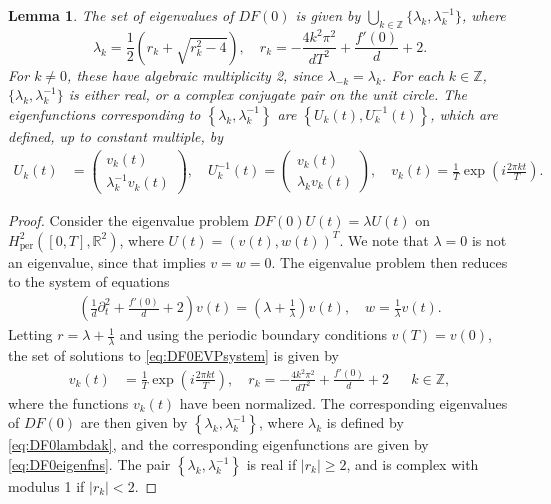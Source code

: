 \documentclass[12pt,reqno]{amsart}
\def\R{{\mathbb R}}
\def\Z{{\mathbb Z}}
\def\per{\textrm{per}}
\newtheorem{lemma}{Lemma}
\theoremstyle{definition}
\begin{document}
\begin{lemma}\label{lemma:DF0eigs}
The set of eigenvalues of $DF(0)$ is given by $\bigcup_{k \in \Z} \{\lambda_k, \lambda_k^{-1} \}$, where 
\begin{equation}\label{eq:DF0lambdak}
\lambda_k = \frac{1}{2}\left( r_k + \sqrt{r_k^2 - 4} \right), \quad r_k = -\frac{4 k^2 \pi^2}{d T^2} + \frac{f'(0)}{d} + 2.
\end{equation}
For $k \neq 0$, these have algebraic multiplicity 2, since $\lambda_{-k} = \lambda_k$. For each $k \in \Z$, $\{\lambda_k, \lambda_k^{-1} \}$ is either real, or a complex conjugate pair on the unit circle. The eigenfunctions corresponding to $\left\{ \lambda_k, \lambda_k^{-1} \right\}$ are $\left\{ U_k(t), U_k^{-1}(t) \right\}$, which are defined, up to constant multiple, by 
\begin{equation}\label{eq:DF0eigenfns}
\begin{aligned}
U_k(t) &= \begin{pmatrix}v_k(t) \\ \lambda_k^{-1}  v_k(t) \end{pmatrix}, \quad
U_k^{-1}(t) = \begin{pmatrix}v_k(t) \\ \lambda_k v_k(t) \end{pmatrix}, \quad
v_k(t) = \frac{1}{T} \exp\left( i \frac{2 \pi k t}{T} \right).
\end{aligned}
\end{equation}
\end{lemma}
\begin{proof}
Consider the eigenvalue problem $DF(0) U(t) = \lambda U(t)$ on $H^2_\per([0,T],\R^2)$, where $U(t) = (v(t), w(t))^T$. We note that $\lambda = 0$ is not an eigenvalue, since that implies $v = w = 0$. The eigenvalue problem then reduces to the system of equations
\begin{align}\label{eq:DF0EVPsystem}
\left( \frac{1}{d}\partial_t^2 + \frac{f'(0)}{d} + 2 \right) v(t) = \left( \lambda + \frac{1}{\lambda} \right) v(t), \quad
w = \frac{1}{\lambda} v(t).
\end{align}
Letting $r = \lambda + \frac{1}{\lambda}$ and using the periodic boundary conditions $v(T) = v(0)$, the set of solutions to \cref{eq:DF0EVPsystem} is given by
\begin{align}
v_k(t) &= \frac{1}{T} \exp\left( i \frac{2 \pi k t}{T} \right), \quad r_k = -\frac{4 k^2 \pi^2}{d T^2} + \frac{f'(0)}{d} + 2 && k \in \Z,
\end{align}
where the functions $v_k(t)$ have been normalized. The corresponding eigenvalues of $DF(0)$ are then given by $\left\{ \lambda_k, \lambda_k^{-1} \right\}$, where $\lambda_k$ is defined by \cref{eq:DF0lambdak}, and the corresponding eigenfunctions are given by \cref{eq:DF0eigenfns}. The pair $\left\{ \lambda_k, \lambda_k^{-1} \right\}$ is real if $|r_k| \geq 2$, and is complex with modulus 1 if $|r_k| < 2$.
\end{proof}
\end{document}
